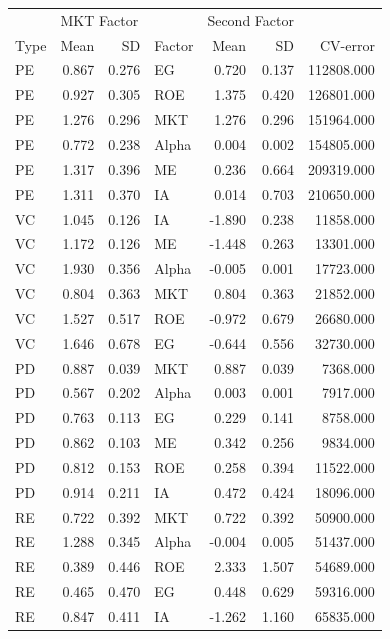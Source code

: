 \documentclass[12pt]{article}
\begin{document}
\begin{table}[ht]
	\centering
	\begin{tabular}{lrrlrrr}
		 & \multicolumn{2}{l}{MKT Factor} & & \multicolumn{2}{l}{Second Factor} & \\ 
		Type & Mean & SD & Factor & Mean & SD & CV-error \\ 
		\hline
		\hline
PE & 0.867 & 0.276 & EG & 0.720 & 0.137 & 112808.000 \\ 
PE & 0.927 & 0.305 & ROE & 1.375 & 0.420 & 126801.000 \\ 
PE & 1.276 & 0.296 & MKT & 1.276 & 0.296 & 151964.000 \\ 
PE & 0.772 & 0.238 & Alpha & 0.004 & 0.002 & 154805.000 \\ 
PE & 1.317 & 0.396 & ME & 0.236 & 0.664 & 209319.000 \\ 
PE & 1.311 & 0.370 & IA & 0.014 & 0.703 & 210650.000 \\ 
\hline
VC & 1.045 & 0.126 & IA & -1.890 & 0.238 & 11858.000 \\ 
VC & 1.172 & 0.126 & ME & -1.448 & 0.263 & 13301.000 \\ 
VC & 1.930 & 0.356 & Alpha & -0.005 & 0.001 & 17723.000 \\ 
VC & 0.804 & 0.363 & MKT & 0.804 & 0.363 & 21852.000 \\ 
VC & 1.527 & 0.517 & ROE & -0.972 & 0.679 & 26680.000 \\ 
VC & 1.646 & 0.678 & EG & -0.644 & 0.556 & 32730.000 \\ 
\hline
PD & 0.887 & 0.039 & MKT & 0.887 & 0.039 & 7368.000 \\ 
PD & 0.567 & 0.202 & Alpha & 0.003 & 0.001 & 7917.000 \\ 
PD & 0.763 & 0.113 & EG & 0.229 & 0.141 & 8758.000 \\ 
PD & 0.862 & 0.103 & ME & 0.342 & 0.256 & 9834.000 \\ 
PD & 0.812 & 0.153 & ROE & 0.258 & 0.394 & 11522.000 \\ 
PD & 0.914 & 0.211 & IA & 0.472 & 0.424 & 18096.000 \\
\hline 
RE & 0.722 & 0.392 & MKT & 0.722 & 0.392 & 50900.000 \\ 
RE & 1.288 & 0.345 & Alpha & -0.004 & 0.005 & 51437.000 \\ 
RE & 0.389 & 0.446 & ROE & 2.333 & 1.507 & 54689.000 \\ 
RE & 0.465 & 0.470 & EG & 0.448 & 0.629 & 59316.000 \\ 
RE & 0.847 & 0.411 & IA & -1.262 & 1.160 & 65835.000 \\ 

\end{tabular}
\end{table}
\end{document}

